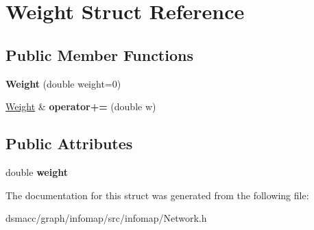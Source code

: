 \hypertarget{structWeight}{}\section{Weight Struct Reference}
\label{structWeight}
\subsection*{Public Member Functions}
\begin{DoxyCompactItemize}
\item 
\mbox{\label{structWeight_ac8d731f7645c290bac392be791647cc2}} 
{\bfseries Weight} (double weight=0)
\item 
\mbox{\label{structWeight_a732b9d33e754f7f2fd38ef7efd92a66b}} 
\mbox{\hyperlink{structWeight}{Weight}} \& {\bfseries operator+=} (double w)
\end{DoxyCompactItemize}
\subsection*{Public Attributes}
\begin{DoxyCompactItemize}
\item 
\mbox{\label{structWeight_ad6ff0b104ab378e8379fee91b51ea720}} 
double {\bfseries weight}
\end{DoxyCompactItemize}


The documentation for this struct was generated from the following file\+:\begin{DoxyCompactItemize}
\item 
dsmacc/graph/infomap/src/infomap/Network.\+h\end{DoxyCompactItemize}
